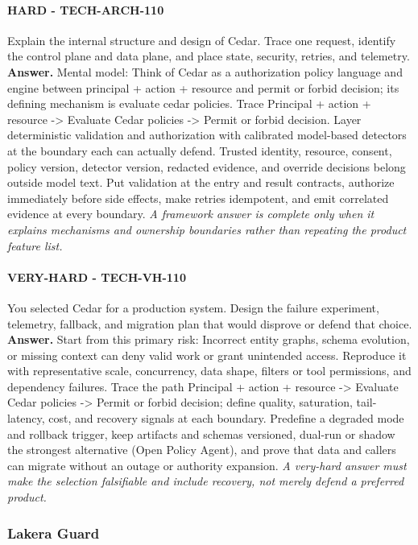 \paragraph{HARD - TECH-ARCH-110} Explain the internal structure and design of Cedar. Trace one request, identify the control plane and data plane, and place state, security, retries, and telemetry.
\textbf{Answer.} Mental model: Think of Cedar as a authorization policy language and engine between principal + action + resource and permit or forbid decision; its defining mechanism is evaluate cedar policies. Trace Principal + action + resource -> Evaluate Cedar policies -> Permit or forbid decision. Layer deterministic validation and authorization with calibrated model-based detectors at the boundary each can actually defend. Trusted identity, resource, consent, policy version, detector version, redacted evidence, and override decisions belong outside model text. Put validation at the entry and result contracts, authorize immediately before side effects, make retries idempotent, and emit correlated evidence at every boundary.
\textit{A framework answer is complete only when it explains mechanisms and ownership boundaries rather than repeating the product feature list.}
\paragraph{VERY-HARD - TECH-VH-110} You selected Cedar for a production system. Design the failure experiment, telemetry, fallback, and migration plan that would disprove or defend that choice.
\textbf{Answer.} Start from this primary risk: Incorrect entity graphs, schema evolution, or missing context can deny valid work or grant unintended access. Reproduce it with representative scale, concurrency, data shape, filters or tool permissions, and dependency failures. Trace the path Principal + action + resource -> Evaluate Cedar policies -> Permit or forbid decision; define quality, saturation, tail-latency, cost, and recovery signals at each boundary. Predefine a degraded mode and rollback trigger, keep artifacts and schemas versioned, dual-run or shadow the strongest alternative (Open Policy Agent), and prove that data and callers can migrate without an outage or authority expansion.
\textit{A very-hard answer must make the selection falsifiable and include recovery, not merely defend a preferred product.}
\subsubsection*{Lakera Guard}
